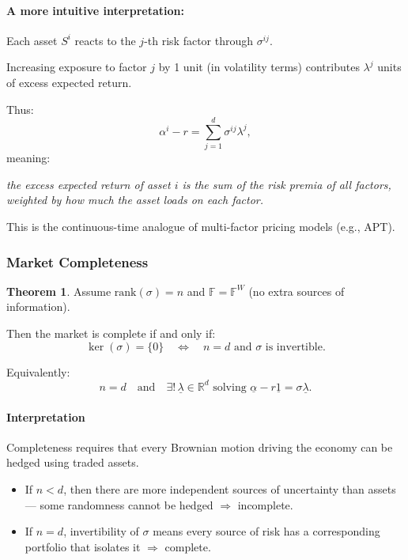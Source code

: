 \documentclass[12pt,a4paper]{article}
\theoremstyle{definition}
\newtheorem{theorem}{Theorem}[section]
\newcommand{\R}{\mathbb{R}}
\begin{document}
\paragraph{A more intuitive interpretation:}

Each asset $S^i$ reacts to the $j$-th risk factor through $\sigma^{ij}$.

Increasing exposure to factor $j$ by 1 unit (in volatility terms) contributes $\lambda^j$ units of excess expected return.

Thus:
\[
\alpha^i - r = \sum_{j=1}^d \sigma^{ij} \lambda^j,
\]
meaning:

\textit{the excess expected return of asset $i$ is the sum of the risk premia of all factors, weighted by how much the asset loads on each factor.}

This is the continuous-time analogue of multi-factor pricing models (e.g., APT).

\subsubsection{Market Completeness}

\begin{theorem}
Assume $\text{rank}(\sigma) = n$ and $\mathbb{F} = \mathbb{F}^W$ (no extra sources of information).

Then the market is complete if and only if:
\[
\ker(\sigma) = \{0\} \quad \iff \quad n = d \text{ and } \sigma \text{ is invertible}.
\]

Equivalently:
\[
n = d \quad \text{and} \quad \exists! \, \underline{\lambda} \in \R^d \text{ solving } \underline{\alpha} - r\underline{1} = \sigma \underline{\lambda}.
\]
\end{theorem}

\paragraph{Interpretation}

Completeness requires that every Brownian motion driving the economy can be hedged using traded assets.

\begin{itemize}
\item If $n < d$, then there are more independent sources of uncertainty than assets — some randomness cannot be hedged $\Rightarrow$ incomplete.
\item If $n = d$, invertibility of $\sigma$ means every source of risk has a corresponding portfolio that isolates it $\Rightarrow$ complete.
\end{itemize}
\end{document}
